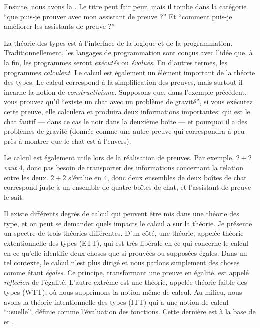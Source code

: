 Ensuite, nous avons la .
Le titre peut fair peur, mais il tombe dans la catégorie ``que puis-je prouver
avec mon assistant de preuve ?'' Et ``comment puis-je améliorer les assistants
de preuve ?''

La théorie des types est à l'interface de la logique et de la programmation.
Traditionnellement, les langages de programmation sont conçus avec l'idée que,
à la fin, les programmes seront \emph{exécutés} ou \emph{évalués}. En d'autres
termes, les programmes \emph{calculent}.
Le calcul est également un élément important de la théorie des types. Le calcul
correspond à la simplification des preuves, mais surtout il incarne la notion de
\emph{constructivisme}. Supposons que, dans l'exemple précédent, vous prouvez
qu'il ``existe un chat avec un problème de gravité'', si vous exécutez cette
preuve, elle calculera et produira deux informations importantes: qui est le
chat fautif --- dans ce cas le noir dans la deuxième boîte --- et pourquoi il a
des problèmes de gravité (donnée comme une autre preuve qui correspondra à peu
près à montrer que le chat est à l'envers).

Le calcul est également utile lors de la réalisation de preuves.
Par exemple, \(2 + 2\) \emph{vaut} \(4\), donc pas besoin de transporter des
informations concernant la relation entre les deux. \(2 + 2\) s'évalue en \(4\),
donc deux ensembles de deux boîtes de chat correspond juste à un ensemble de
quatre boîtes de chat, et l'assistant de preuve le sait.

Il existe différents degrés de calcul qui peuvent être mis dans une théorie des
type, et on peut se demander quels impacts le calcul a sur la théorie.
Je présente un spectre de trois théories différentes.
D'un côté, une théorie, appelée théorie extentionnelle des types (ETT), qui est
très libérale en ce qui concerne le calcul en ce qu'elle identifie deux choses
que  si prouvées ou supposées égales.
%
Dans un tel contexte, le calcul n'est plus dirigé et nous parlons simplement des
choses comme étant \emph{égales}.
Ce principe, transformant une preuve en égalité, est appelé \emph{reflecion} de
l'égalité.
L'autre extrême est une théorie, appelée théorie faible des types (WTT), où nous
supprimons la notion même de calcul. Au milieu, nous avons la théorie
intentionnelle des types (ITT) qui a une notion de calcul ``usuelle'', définie
comme l'évaluation des fonctions. Cette dernière est à la base de \Coq et \Agda.

